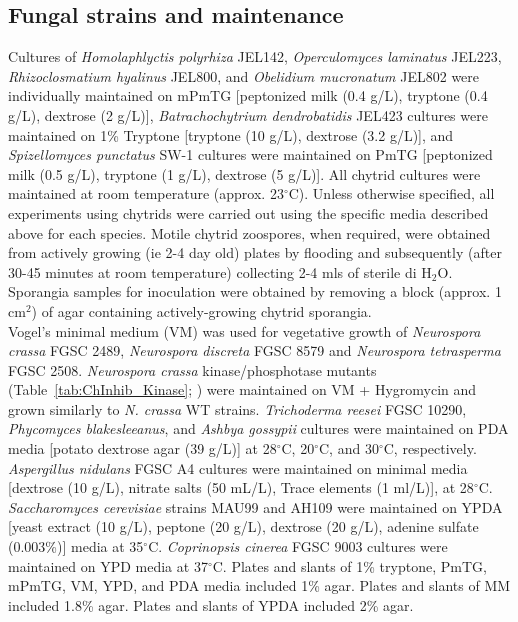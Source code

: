 \subsection*{Fungal strains and maintenance}
Cultures of \textit{Homolaphlyctis polyrhiza} JEL142, \textit{Operculomyces laminatus} JEL223, \textit{Rhizoclosmatium hyalinus} JEL800, and \textit{Obelidium mucronatum} JEL802 were individually maintained on mPmTG [peptonized milk (0.4 g/L), tryptone (0.4 g/L), dextrose (2 g/L)], \textit{Batrachochytrium dendrobatidis} JEL423 cultures were maintained on 1\% Tryptone [tryptone (10 g/L), dextrose (3.2 g/L)], and \textit{Spizellomyces punctatus} SW-1 cultures were maintained on PmTG [peptonized milk (0.5 g/L), tryptone (1 g/L), dextrose (5 g/L)]. All chytrid cultures were maintained at room temperature (approx. 23$^{\circ}$C). Unless otherwise specified, all experiments using chytrids were carried out using the specific media described above for each species. Motile chytrid zoospores, when required, were obtained from actively growing (ie 2-4 day old) plates by flooding and subsequently (after 30-45 minutes at room temperature) collecting 2-4 mls of sterile di H$_{2}$O. Sporangia samples for inoculation were obtained by removing a block (approx. 1 cm$^{2}$) of agar containing actively-growing chytrid sporangia.\\
\indent Vogel's minimal medium (VM) \cite{Davis1970} was used for vegetative growth of \textit{Neurospora crassa} FGSC 2489, \textit{Neurospora discreta} FGSC 8579 and \textit{Neurospora tetrasperma} FGSC 2508. \textit{Neurospora crassa} kinase/phosphotase mutants (Table~\ref{tab:ChInhib_Kinase}; \cite{Park2011}) were maintained on VM + Hygromycin and grown similarly to \textit{N. crassa} WT strains. \textit{Trichoderma reesei} FGSC 10290, \textit{Phycomyces blakesleeanus}, and \textit{Ashbya gossypii} cultures were maintained on PDA media [potato dextrose agar (39 g/L)] at 28$^{\circ}$C, 20$^{\circ}$C, and 30$^{\circ}$C, respectively. \textit{Aspergillus nidulans} FGSC A4 cultures were maintained on minimal media [dextrose (10 g/L), nitrate salts (50 mL/L), Trace elements (1 ml/L)], at 28$^{\circ}$C. \textit{Saccharomyces cerevisiae} strains MAU99 and AH109 were maintained on YPDA [yeast extract (10 g/L), peptone (20 g/L), dextrose (20 g/L), adenine sulfate (0.003\%)] media at 35$^{\circ}$C. \textit{Coprinopsis cinerea} FGSC 9003 cultures were maintained on YPD media at 37$^{\circ}$C.  Plates and slants of 1\% tryptone, PmTG, mPmTG, VM, YPD, and PDA media included 1\% agar. Plates and slants of MM included 1.8\% agar. Plates and slants of YPDA included 2\% agar.\\
